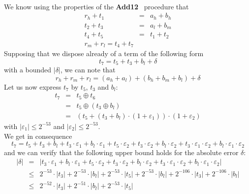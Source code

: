 \documentclass[a4paper,10pt,twoside]{article}
\newenvironment{proof}[1][Proof]{\begin{trivlist}
\item[\hskip \labelsep {\bfseries #1}]}{\end{trivlist}}
\newcommand{\hi}{\ensuremath{\mathit{h}}}
\newcommand{\mi}{\ensuremath{\mathit{m}}}
\newcommand{\lo}{\ensuremath{\mathit{l}}}
\newcommand{\Add}{{\bf Add12}}
\renewcommand{\epsilon}{\varepsilon}
\begin{document}
\begin{proof} ~ \\
We know using the properties of the \Add~ procedure that
\begin{eqnarray*}
r_\hi + t_1 & = & a_\hi + b_\hi \\
t_2 + t_3 & = & a_\lo + b_\mi \\
t_4 + t_5 & = & t_1 + t_2 \\
r_\mi + r_\lo = t_4 + t_7
\end{eqnarray*}
Supposing that we dispose already of a term of the following form
$$t_7 = t_5 + t_3 + b_\lo + \delta$$
with a bounded $\left \vert \delta \right \vert$,
we can note that
$$r_\hi + r_\mi + r_\lo = \left( a_\hi + a_\lo \right) + \left( b_\hi + b_\mi + b_\lo \right) + \delta$$
Let us now express $t_7$ by $t_5$, $t_3$ and $b_\lo$:
\begin{eqnarray*}
t_7 & = & t_5 \oplus t_6 \\
& = & t_5 \oplus \left( t_3 \oplus b_\lo \right) \\
& = & \left( t_5 + \left( t_3 + b_\lo \right) \cdot \left( 1 + \epsilon_1 \right) \right) \cdot \left( 1 + \epsilon_2 \right)
\end{eqnarray*}
with $\left \vert \epsilon_1 \right \vert \leq 2^{-53}$ and $\left \vert \epsilon_2 \right \vert \leq 2^{-53}$.\\
We get in consequence
$$t_7 = t_5 + t_3 + b_\lo + t_3 \cdot \epsilon_1 + b_\lo \cdot \epsilon_1 + t_5 \cdot \epsilon_2 + t_3 \cdot \epsilon_2 + b_\lo \cdot \epsilon_2 +
t_3 \cdot \epsilon_1 \cdot \epsilon_2 + b_\lo \cdot \epsilon_1 \cdot \epsilon_2$$
and we can verify that the following upper bound holds for the absolute error $\delta$:
\begin{eqnarray*}
\left \vert \delta \right \vert & = &
\left \vert t_3 \cdot \epsilon_1 + b_\lo \cdot \epsilon_1 + t_5 \cdot \epsilon_2 + t_3 \cdot \epsilon_2 + b_\lo \cdot \epsilon_2 +
t_3 \cdot \epsilon_1 \cdot \epsilon_2 + b_\lo \cdot \epsilon_1 \cdot \epsilon_2 \right \vert \\
& \leq & 2^{-53} \cdot \left \vert t_3 \right \vert + 2^{-53} \cdot \left \vert b_\lo \right \vert + 2^{-53} \cdot \left \vert t_5 \right \vert +
2^{-53} \cdot \left \vert b_\lo \right \vert + 2^{-106} \cdot \left \vert t_3 \right \vert + 2^{-106} \cdot \left \vert b_\lo \right \vert \\
& \leq & 2^{-52} \cdot \left \vert t_3 \right \vert + 2^{-51} \cdot \left \vert b_\lo \right \vert + 2^{-53} \cdot \left \vert t_5 \right \vert
\end{eqnarray*}

\end{proof}
\end{document}
